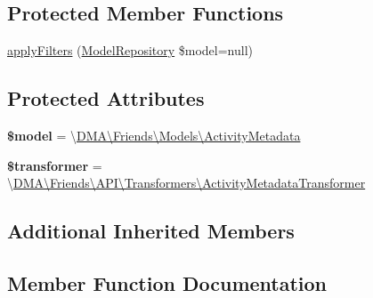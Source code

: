 \subsection*{Protected Member Functions}
\begin{DoxyCompactItemize}
\item 
\hyperlink{classDMA_1_1Friends_1_1API_1_1Resources_1_1ActivityMetadataResource_add571e6be47126c2bee474f570c566ab}{apply\+Filters} (\hyperlink{classDMA_1_1Friends_1_1Classes_1_1API_1_1ModelRepository}{Model\+Repository} \$model=null)
\end{DoxyCompactItemize}
\subsection*{Protected Attributes}
\begin{DoxyCompactItemize}
\item 
\hypertarget{classDMA_1_1Friends_1_1API_1_1Resources_1_1ActivityMetadataResource_a2d8840084ab4089cd0be441fa95b9357}{}{\bfseries \$model} = \textquotesingle{}\textbackslash{}\hyperlink{classDMA_1_1Friends_1_1Models_1_1ActivityMetadata}{D\+M\+A\textbackslash{}\+Friends\textbackslash{}\+Models\textbackslash{}\+Activity\+Metadata}\textquotesingle{}\label{classDMA_1_1Friends_1_1API_1_1Resources_1_1ActivityMetadataResource_a2d8840084ab4089cd0be441fa95b9357}

\item 
\hypertarget{classDMA_1_1Friends_1_1API_1_1Resources_1_1ActivityMetadataResource_a4aef74cbec209367d4eb75887f9dfedb}{}{\bfseries \$transformer} = \textquotesingle{}\textbackslash{}\hyperlink{classDMA_1_1Friends_1_1API_1_1Transformers_1_1ActivityMetadataTransformer}{D\+M\+A\textbackslash{}\+Friends\textbackslash{}\+A\+P\+I\textbackslash{}\+Transformers\textbackslash{}\+Activity\+Metadata\+Transformer}\textquotesingle{}\label{classDMA_1_1Friends_1_1API_1_1Resources_1_1ActivityMetadataResource_a4aef74cbec209367d4eb75887f9dfedb}

\end{DoxyCompactItemize}
\subsection*{Additional Inherited Members}


\subsection{Member Function Documentation}
\hypertarget{classDMA_1_1Friends_1_1API_1_1Resources_1_1ActivityMetadataResource_add571e6be47126c2bee474f570c566ab}{}
